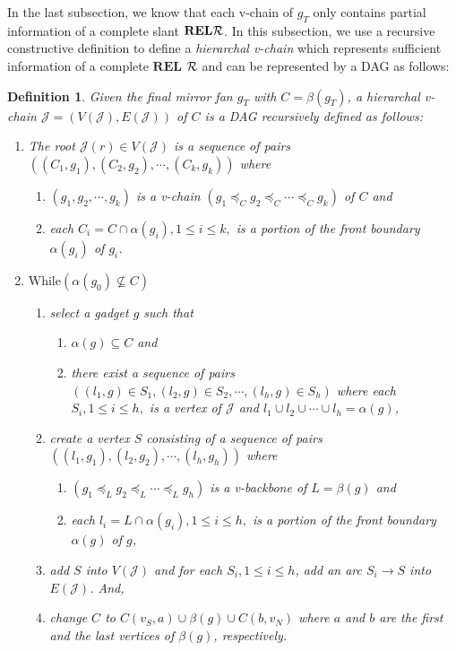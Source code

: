 \documentclass[11pt]{article}
\newcommand{\R}{{\cal R}}
\newcommand{\JJ}{\mathcal{J}}
\newcommand{\REL}{\mathbf{REL}}
\newtheorem{definition}[figure]{Definition}
\begin{document}
In the last subsection,
we know that each v-chain of $g_T$ only contains partial information of a
complete slant $\REL \R$.
In this subsection, we use a recursive constructive definition
to define a \emph{hierarchal v-chain}
which represents
sufficient information of a complete $\REL$ $\R$ and
can be represented by a DAG
as follows:
\begin{definition}\label{def:h-v-chain}
Given the final mirror fan $g_T$ with $C=\beta(g_T)$,
a \emph{hierarchal v-chain} $\JJ=(V(\JJ), E(\JJ))$ of $C$ is a DAG
recursively defined as follows:
\begin{enumerate}
\item The \emph{root} $\JJ(r)\in V(\JJ)$
is a sequence of pairs $((C_1, g_1), (C_2, g_2), \cdots, (C_k, g_k))$
where
\begin{enumerate}
\item $(g_1, g_2, \cdots, g_k)$ is a v-chain
$(g_1\preceq_C g_2 \preceq_C \cdots \preceq_C g_k)$ of $C$ and

\item each $C_i=C\cap \alpha(g_i), 1\leq i\leq k,$ is a portion of the front boundary $\alpha(g_i)$ of $g_i$.
\end{enumerate}


\item $\mbox{While}(\alpha(g_0) \nsubseteq C)$

\begin{enumerate}
\item select a gadget $g$ such that
\begin{enumerate}
\item $\alpha(g) \subseteq C$ and
\item there exist a sequence of pairs
$((l_1, g)\in S_1, (l_2, g)\in S_2, \cdots, (l_h, g)\in S_h)$
where each $S_i, 1\leq i\leq h,$ is a vertex of $\JJ$ and
$l_1\cup l_2 \cup \cdots \cup l_h = \alpha(g)$,
\end{enumerate}



\item create a vertex $S$ consisting of a sequence of pairs
$((l_1, g_1), (l_2, g_2), \cdots, (l_h, g_h))$
where
\begin{enumerate}
\item $(g_1\preceq_L g_2\preceq_L \cdots \preceq_L g_h)$
is a v-backbone of $L=\beta(g)$ and
\item each $l_i=L\cap \alpha(g_i), 1\leq i\leq h,$ is a portion
of the front boundary $\alpha(g)$ of $g$,
\end{enumerate}

\item add $S$ into $V(\JJ)$ and
for each $S_i, 1\leq i\leq h$,
add an arc $S_i \rightarrow S$ into $E(\JJ)$. And,

\item change $C$ to $C(v_S, a) \cup \beta(g) \cup C(b, v_N)$
where $a$ and $b$ are the first and the last vertices of $\beta(g)$, respectively.

\end{enumerate}

\end{enumerate}


\end{definition}
\end{document}
